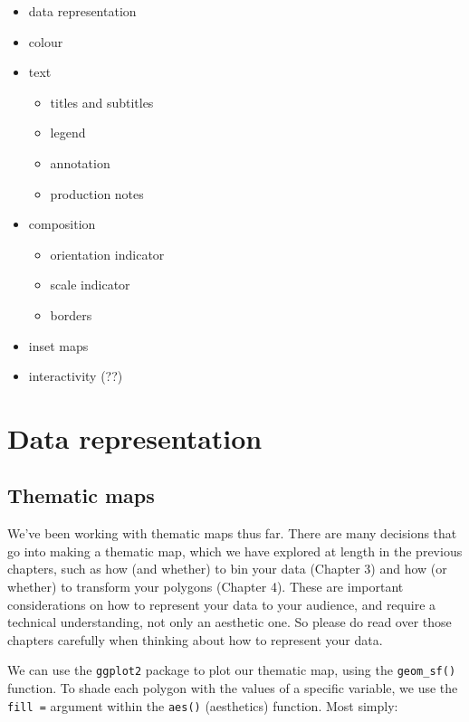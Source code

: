 \documentclass[
]{book}
\providecommand{\tightlist}{%
  \setlength{\itemsep}{0pt}\setlength{\parskip}{0pt}}
\begin{document}
\begin{itemize}
\tightlist
\item
  data representation
\item
  colour
\item
  text

  \begin{itemize}
  \tightlist
  \item
    titles and subtitles
  \item
    legend
  \item
    annotation
  \item
    production notes
  \end{itemize}
\item
  composition

  \begin{itemize}
  \tightlist
  \item
    orientation indicator
  \item
    scale indicator
  \item
    borders
  \end{itemize}
\item
  inset maps
\item
  interactivity (??)
\end{itemize}

\hypertarget{data-representation}{%
\section{Data representation}\label{data-representation}}

\hypertarget{thematic-maps}{%
\subsection{Thematic maps}\label{thematic-maps}}

We've been working with thematic maps thus far. There are many decisions that go into making a thematic map, which we have explored at length in the previous chapters, such as how (and whether) to bin your data (Chapter 3) and how (or whether) to transform your polygons (Chapter 4). These are important considerations on how to represent your data to your audience, and require a technical understanding, not only an aesthetic one. So please do read over those chapters carefully when thinking about how to represent your data.

We can use the \texttt{ggplot2} package to plot our thematic map, using the \texttt{geom\_sf()} function. To shade each polygon with the values of a specific variable, we use the \texttt{fill\ =} argument within the \texttt{aes()} (aesthetics) function. Most simply:
\end{document}
